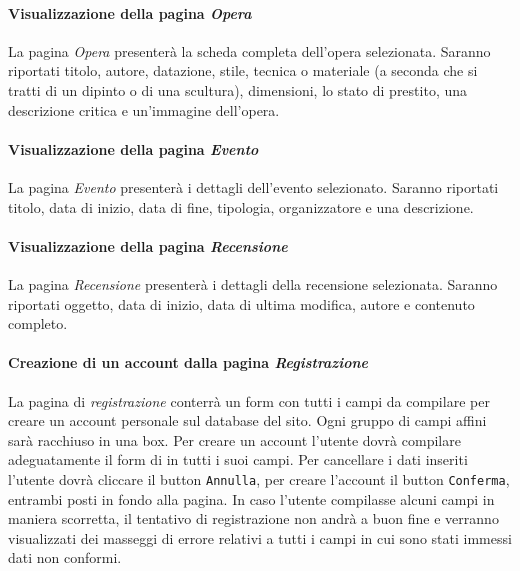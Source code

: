 \paragraph{Visualizzazione della pagina \textit{Opera}}
\label{analisi-casi-uso-attori-principali-utente-generico-15}
La pagina \textit{Opera} presenterà la scheda completa dell'opera selezionata. Saranno riportati titolo,  autore, datazione, stile, tecnica o materiale (a seconda che si tratti di un dipinto o di una scultura), dimensioni, lo stato di prestito, una descrizione critica e un'immagine dell'opera.


\paragraph{Visualizzazione della pagina \textit{Evento}}
\label{analisi-casi-uso-attori-principali-utente-generico-16}
La pagina \textit{Evento} presenterà i dettagli dell'evento selezionato. Saranno riportati titolo, data di inizio, data di fine, tipologia, organizzatore e una descrizione.


\paragraph{Visualizzazione della pagina \textit{Recensione}}
\label{analisi-casi-uso-attori-principali-utente-generico-17}
La pagina \textit{Recensione} presenterà i dettagli della recensione selezionata. Saranno riportati oggetto, data di inizio, data di ultima modifica, autore e contenuto completo.


\paragraph{Creazione di un account dalla pagina \textit{Registrazione}}
\label{analisi-casi-uso-attori-principali-utente-generico-18}
La pagina di \textit{registrazione} conterrà un form con tutti i campi da compilare per creare un account personale sul database del sito. Ogni gruppo di campi affini sarà racchiuso in una box. Per creare un account l'utente dovrà compilare adeguatamente il form di in tutti i suoi campi. Per cancellare i dati inseriti l'utente dovrà cliccare il button \texttt{Annulla}, per creare l'account il button  \texttt{Conferma}, entrambi posti in fondo alla pagina. In caso l'utente compilasse alcuni campi in maniera scorretta, il tentativo di registrazione non andrà a buon fine e verranno visualizzati dei masseggi di errore relativi a tutti i campi in cui sono stati immessi dati non conformi.


